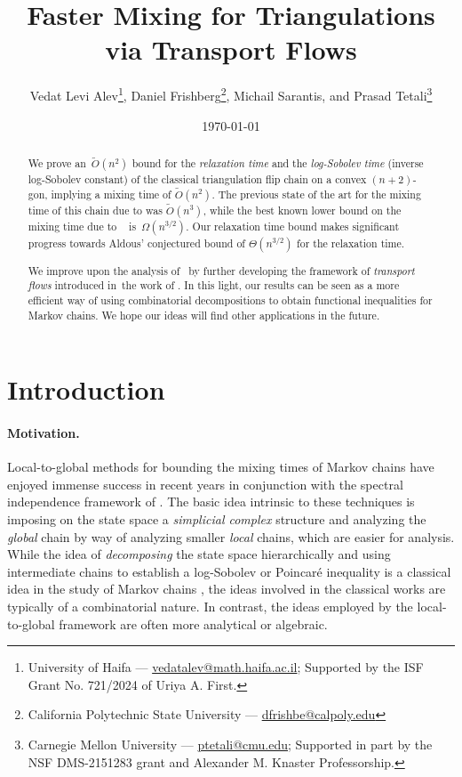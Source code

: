\documentclass[a4paper, 12p]{article}
\title{Faster Mixing for Triangulations via Transport Flows}
\author{Vedat Levi Alev\thanks{University of Haifa --- \href{mailto:vedatalev@math.haifa.ac.il}{vedatalev@math.haifa.ac.il}; Supported by the ISF Grant No. 721/2024 of Uriya A. First.}, Daniel Frishberg\thanks{California Polytechnic State University
---  \href{mailto:dfrishbe@calpoly.edu}{dfrishbe@calpoly.edu}}, Michail Sarantis, and Prasad Tetali\thanks{Carnegie Mellon University --- \href{mailto:ptetali@cmu.edu}{ptetali@cmu.edu}; Supported in part by the NSF DMS-2151283 grant
and Alexander M. Knaster Professorship.}}
\date{\today}
\numberwithin{equation}{section}
\begin{document}
\maketitle

\begin{abstract}
We prove an~$\widetilde O(n^2)$ bound for the \emph{relaxation time} and the \emph{log-Sobolev time} (inverse log-Sobolev constant) of the classical triangulation flip chain on a convex $(n+2)$-gon, implying a mixing time of $\widetilde O(n^2)$. The previous state of the art for the mixing time of this chain due to \citeauthor{eppstein2022improved} \cite{eppstein2022improved} was $\widetilde O(n^3)$, while the best known lower bound on the mixing time due to \citeauthor{mrs}~\cite{mrs} is~$\Omega(n^{3/2})$. Our relaxation time bound makes significant progress towards Aldous' \cite{aldousconj} conjectured bound of $\Theta(n^{3/2})$ for the relaxation time.

We improve upon the analysis of~\cite{eppstein2022improved} by further developing the framework of \emph{transport flows} introduced in~the work \cite{weimingjs} of \citeauthor{weimingjs}. In this light, our results can be seen as a more efficient way of using combinatorial decompositions to obtain functional inequalities for Markov chains. We hope our ideas will find other applications in the future. 
\end{abstract}

\section{Introduction}


\paragraph{Motivation.}

Local-to-global methods for bounding the mixing times of Markov chains \cite{kaufman2020high, alevlau, guo2020local, chen2021optimal, anari2022entropic} have enjoyed immense success in recent years in conjunction with the spectral independence framework of \cite{anarihardcore, chen2021rapidcol, feng2022rapid, anari2022entropic}. The basic idea intrinsic to these techniques is imposing on the state space a \emph{simplicial complex} structure and analyzing the \emph{global} chain by way of analyzing smaller \emph{local} chains, which are easier for analysis. While the idea of \emph{decomposing} the state space hierarchically and using intermediate chains to establish a log-Sobolev or Poincar\'e inequality is a classical idea in the study of Markov chains \cite{kaibelexp, eppstein2022improved, eppstein2021rapid, heinrich2020glauber, zongchentw,jstv,jstvimproved,federmihail}, the ideas involved in the classical works are typically of a combinatorial nature. In contrast, the ideas employed by the local-to-global framework are often more analytical or algebraic.
\end{document}
